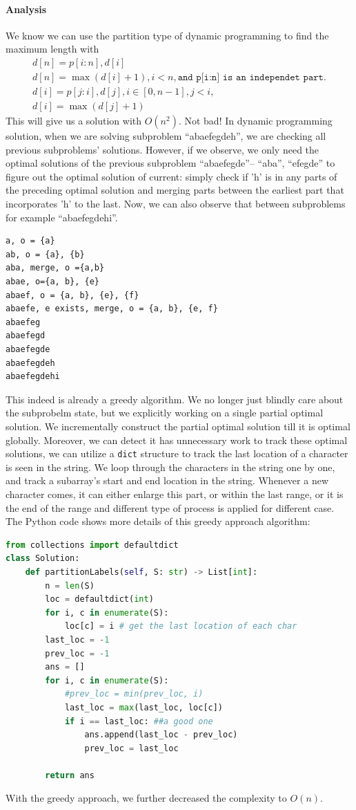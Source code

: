 \documentclass[../main.tex]{subfiles}
\begin{document}
\paragraph{Analysis} We know we can use the partition type of dynamic programming to find the maximum length with
\begin{align}
    d[n] = p[i:n],  d[i] \\
    d[n] = \max(d[i] + 1), i < n, \texttt{and p[i:n] is   an independet part}.\\
    d[i] = p[j:i], d[j], i\in[0, n-1], j<i, \\
    d[i] = \max(d[j] + 1)
\end{align}
This will give us a solution with $O(n^2)$. Not bad! In dynamic programming solution, when we are solving subproblem ``abaefegdeh'', we are checking all previous subproblems' solutions. However, if we observe, we only need the optimal solutions of the previous subproblem ``abaefegde''-- ``aba'', ``efegde'' to figure out the optimal solution of current: simply check if 'h' is in any parts of the preceding optimal solution and merging parts between the earliest part that incorporates 'h' to the last.  Now, we  can also observe that between subproblems for example ``abaefegdehi''.
\begin{lstlisting}[numbers=none]
a, o = {a}
ab, o = {a}, {b}
aba, merge, o ={a,b}
abae, o={a, b}, {e}
abaef, o = {a, b}, {e}, {f}
abaefe, e exists, merge, o = {a, b}, {e, f}
abaefeg
abaefegd
abaefegde
abaefegdeh
abaefegdehi
\end{lstlisting}
This indeed is already a greedy algorithm. We no longer just blindly care about the subprobelm state, but we explicitly working on a single partial optimal solution. We incrementally construct  the partial optimal solution till it is optimal globally. Moreover, we can detect it has unnecessary work to track these optimal solutions,  we can utilize a \texttt{dict} structure to track the last location of a character is seen in the string. We loop through the characters in the string one by one, and track a subarray's start and end location in the string. Whenever a new character comes, it can either enlarge this part, or within the last range, or it is the end of the range and different type of process is applied for different case. The Python code shows more details of this greedy approach algorithm:
\begin{lstlisting}[language=Python]
from collections import defaultdict
class Solution:
    def partitionLabels(self, S: str) -> List[int]:
        n = len(S)
        loc = defaultdict(int)
        for i, c in enumerate(S):
            loc[c] = i # get the last location of each char
        last_loc = -1
        prev_loc = -1
        ans = []
        for i, c in enumerate(S):
            #prev_loc = min(prev_loc, i)
            last_loc = max(last_loc, loc[c])
            if i == last_loc: ##a good one                
                ans.append(last_loc - prev_loc)
                prev_loc = last_loc
                
        return ans
\end{lstlisting}
With the greedy approach, we further decreased the complexity to $O(n)$. 
\end{document}
